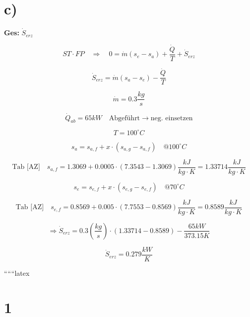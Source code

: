 

\section*{c)}
\textbf{Ges:} $\dot{S}_{erz}$

\[
ST \cdot FP \quad \Rightarrow \quad 0 = \dot{m}(s_e - s_a) + \frac{\dot{Q}}{T} + \dot{S}_{erz}
\]

\[
\dot{S}_{erz} = \dot{m}(s_a - s_e) - \frac{\dot{Q}}{T}
\]

\[
\dot{m} = 0.3 \frac{kg}{s}
\]

\[
\dot{Q}_{ab} = 65 kW \quad \text{Abgeführt} \rightarrow \text{neg. einsetzen}
\]

\[
T = 100^\circ C
\]

\[
s_a = s_{a,f} + x \cdot (s_{a,g} - s_{a,f}) \quad @ 100^\circ C
\]

\[
\text{Tab [AZ]} \quad s_{a,f} = 1.3069 + 0.0005 \cdot (7.3543 - 1.3069) \frac{kJ}{kg \cdot K} = 1.33714 \frac{kJ}{kg \cdot K}
\]

\[
s_e = s_{e,f} + x \cdot (s_{e,g} - s_{e,f}) \quad @ 70^\circ C
\]

\[
\text{Tab [AZ]} \quad s_{e,f} = 0.8569 + 0.005 \cdot (7.7553 - 0.8569) \frac{kJ}{kg \cdot K} = 0.8589 \frac{kJ}{kg \cdot K}
\]

\[
\Rightarrow \dot{S}_{erz} = 0.3 \left( \frac{kg}{s} \right) \cdot (1.33714 - 0.8589) - \frac{65 kW}{373.15 K}
\]

\[
\dot{S}_{erz} = 0.279 \frac{kW}{K}
\]

``````latex


\section*{1}